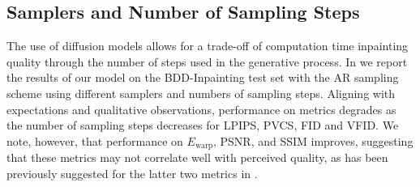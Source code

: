 \subsection{Samplers and Number of Sampling Steps}
The use of diffusion models allows for a trade-off of computation time \vs inpainting quality through the number of steps used in the generative process. In  we report the results of our model on the BDD-Inpainting test set with the AR sampling scheme using different samplers and numbers of sampling steps. Aligning with expectations and qualitative observations, performance on metrics degrades as the number of sampling steps decreases for LPIPS, PVCS, FID and VFID. We note, however, that performance on $E_\text{warp}$, PSNR, and SSIM improves, suggesting that these metrics may not correlate well with perceived quality, as has been previously suggested for the latter two metrics in \citet{perceptual}.
\begin{table}[t]
\centering
\caption{Effect of diffusion samplers, using AR sampling on BDD-Inpainting.}
\label{table:samplingsteps}
\end{table}
